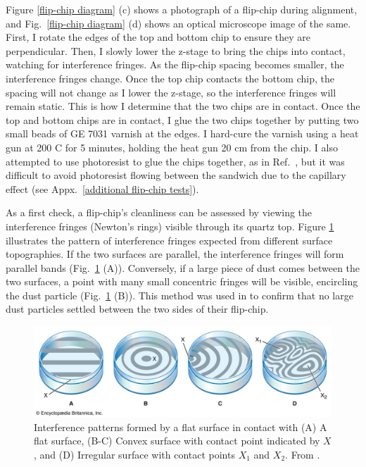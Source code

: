\documentclass[double,12pt,1in,seploa]{beavtex}
\begin{document}
Figure \ref{flip-chip diagram} (c) shows a photograph of a flip-chip during alignment, and Fig.\ \ref{flip-chip diagram} (d) shows an optical microscope image of the same. First, I rotate the edges of the top and bottom chip to ensure they are perpendicular. Then, I slowly lower the z-stage to bring the chips into contact, watching for interference fringes. As the flip-chip spacing becomes smaller, the interference fringes change. Once the top chip contacts the bottom chip, the spacing will not change as I lower the z-stage, so the interference fringes will remain static. This is how I determine that the two chips are in contact. Once the top and bottom chips are in contact, I glue the two chips together by putting two small beads of GE 7031 varnish at the edges. I hard-cure the varnish using a heat gun at 200 C for 5 minutes, holding the heat gun 20 cm from the chip. I also attempted to use photoresist to glue the chips together, as in Ref.\ \cite{beukman_noninvasive_2015}, but it was difficult to avoid photoresist flowing between the sandwich due to the capillary effect (see Appx.\ \ref{additional flip-chip tests}).

As a first check, a flip-chip's cleanliness can be assessed by viewing the interference fringes (Newton's rings) visible through its quartz top. Figure \ref{newtonsrings} illustrates the pattern of interference fringes expected from different surface topographies. If the two surfaces are parallel, the interference fringes will form parallel bands (Fig.\ \ref{newtonsrings} (A)). Conversely, if a large piece of dust comes between the two surfaces, a point with many small concentric fringes will be visible, encircling the dust particle (Fig.\ \ref{newtonsrings} (B)). This method was used in \cite{bennaceur_mechanical_2015} to confirm that no large dust particles settled between the two sides of their flip-chip.

\begin{figure}
    \includegraphics[width=1\textwidth]{newtonsrings.png}
    \caption{Interference patterns formed by a flat surface in contact with (A) A flat surface, (B-C) Convex surface with contact point indicated by $X$, and (D) Irregular surface with contact points $X_1$ and $X_2$.  From \cite{noauthor_newtons_nodate}.}
    \label{newtonsrings}
\end{figure}
\end{document}
